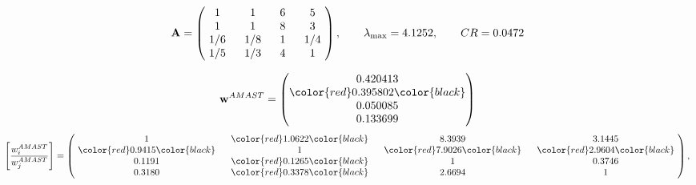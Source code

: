 \begin{example}
\begin{equation*}
\mathbf{A} =
\begin{pmatrix}
$\,\,$ 1 $\,\,$ & $\,\,$1$\,\,$ & $\,\,$6$\,\,$ & $\,\,$5 $\,\,$ \\
$\,\,$ 1 $\,\,$ & $\,\,$ 1 $\,\,$ & $\,\,$8$\,\,$ & $\,\,$3 $\,\,$ \\
$\,\,$ 1/6$\,\,$ & $\,\,$ 1/8$\,\,$ & $\,\,$ 1 $\,\,$ & $\,\,$ 1/4 $\,\,$ \\
$\,\,$ 1/5$\,\,$ & $\,\,$ 1/3$\,\,$ & $\,\,$4$\,\,$ & $\,\,$ 1  $\,\,$ \\
\end{pmatrix},
\qquad
\lambda_{\max} =
4.1252,
\qquad
CR = 0.0472
\end{equation*}

\begin{equation*}
\mathbf{w}^{AMAST} =
\begin{pmatrix}
0.420413\\
\color{red} 0.395802\color{black} \\
0.050085\\
0.133699
\end{pmatrix}\end{equation*}
\begin{equation*}
\left[ \frac{{w}^{AMAST}_i}{{w}^{AMAST}_j} \right] =
\begin{pmatrix}
$\,\,$ 1 $\,\,$ & $\,\,$\color{red} 1.0622\color{black} $\,\,$ & $\,\,$8.3939$\,\,$ & $\,\,$3.1445$\,\,$ \\
$\,\,$\color{red} 0.9415\color{black} $\,\,$ & $\,\,$ 1 $\,\,$ & $\,\,$\color{red} 7.9026\color{black} $\,\,$ & $\,\,$\color{red} 2.9604\color{black}   $\,\,$ \\
$\,\,$0.1191$\,\,$ & $\,\,$\color{red} 0.1265\color{black} $\,\,$ & $\,\,$ 1 $\,\,$ & $\,\,$0.3746 $\,\,$ \\
$\,\,$0.3180$\,\,$ & $\,\,$\color{red} 0.3378\color{black} $\,\,$ & $\,\,$2.6694$\,\,$ & $\,\,$ 1  $\,\,$ \\
\end{pmatrix},
\end{equation*}


\end{example}

